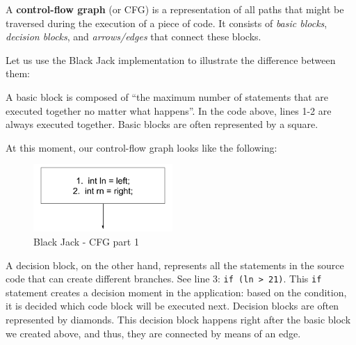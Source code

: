 A \textbf{control-flow graph} (or CFG) is a representation of all paths
that might be traversed during the execution of a piece of code. It
consists of \emph{basic blocks}, \emph{decision blocks}, and
\emph{arrows/edges} that connect these blocks.

Let us use the Black Jack implementation to illustrate the difference
between them:

\begin{Shaded}
\begin{Highlighting}[]
 
    \NormalTok{(}
  
  
  \NormalTok{)}
\NormalTok{;}
  \NormalTok{)}
\NormalTok{;}
  
    
  
   
\NormalTok{  \}}
\NormalTok{\}}
\end{Highlighting}
\end{Shaded}

A basic block is composed of ``the maximum number of statements that are
executed together no matter what happens''. In the code above, lines 1-2
are always executed together. Basic blocks are often represented by a
square.

At this moment, our control-flow graph looks like the following:

\begin{figure}
\centering
\includegraphics{img/structural-testing/examples/bj-p1.png}
\caption{Black Jack - CFG part 1}
\end{figure}

A decision block, on the other hand, represents all the statements in
the source code that can create different branches. See line 3:
\texttt{if\ (ln\ \textgreater{}\ 21)}. This \texttt{if} statement
creates a decision moment in the application: based on the condition, it
is decided which code block will be executed next. Decision blocks are
often represented by diamonds. This decision block happens right after
the basic block we created above, and thus, they are connected by means
of an edge.

